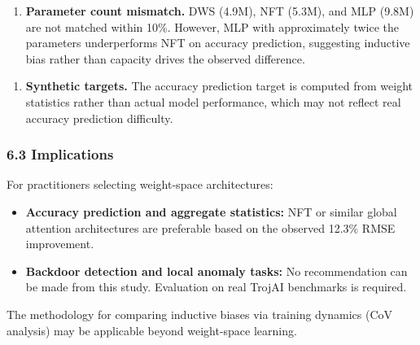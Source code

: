 \begin{enumerate}
\item \textbf{Parameter count mismatch.} DWS (4.9M), NFT (5.3M), and MLP (9.8M) are not matched within 10\%. However, MLP with approximately twice the parameters underperforms NFT on accuracy prediction, suggesting inductive bias rather than capacity drives the observed difference.
\end{enumerate}

\begin{enumerate}
\item \textbf{Synthetic targets.} The accuracy prediction target is computed from weight statistics rather than actual model performance, which may not reflect real accuracy prediction difficulty.
\end{enumerate}

\subsubsection{6.3 Implications}

For practitioners selecting weight-space architectures:

\begin{itemize}
\item \textbf{Accuracy prediction and aggregate statistics:} NFT or similar global attention architectures are preferable based on the observed 12.3\% RMSE improvement.
\end{itemize}

\begin{itemize}
\item \textbf{Backdoor detection and local anomaly tasks:} No recommendation can be made from this study. Evaluation on real TrojAI benchmarks is required.
\end{itemize}

The methodology for comparing inductive biases via training dynamics (CoV analysis) may be applicable beyond weight-space learning.
